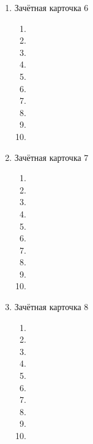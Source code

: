\documentclass[12pt, a4paper]{article}
\begin{document}
\begin{enumerate}
\begin{enumerate}[label=\asbuk*)]
		\item 
		\item 
		\item 
		\item 
		\item 
		\item 
		\item 
		\item 
		\item 
		\item 
	\end{enumerate}
	\item Зачётная карточка 6
	\begin{enumerate}[label=\asbuk*)]
		\item 
		\item 
		\item 
		\item 
		\item 
		\item 
		\item 
		\item 
		\item 
		\item 
	\end{enumerate}
	\item Зачётная карточка 7
	\begin{enumerate}[label=\asbuk*)]
		\item 
		\item 
		\item 
		\item 
		\item 
		\item 
		\item 
		\item 
		\item 
		\item 
		\end{enumerate}
	\item Зачётная карточка 8
	\begin{enumerate}[label=\asbuk*)]
		\item 
		\item 
		\item 
		\item 
		\item 
		\item 
		\item 
		\item 
		\item
		\item
	\end{enumerate}
\end{enumerate}
\end{document}
